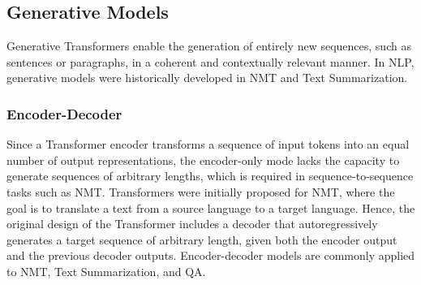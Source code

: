 

\subsection{Generative Models} 

Generative Transformers enable the generation of entirely new sequences, such as sentences or paragraphs, in a coherent and contextually relevant manner. In \ac{NLP}, generative models were historically developed in \ac{NMT} and Text Summarization. 




\subsubsection{Encoder-Decoder}


Since a Transformer encoder transforms a sequence of input tokens into an equal number of output representations, the encoder-only mode lacks the capacity to generate sequences of arbitrary lengths, which is required in sequence-to-sequence tasks such as \ac{NMT}. Transformers were initially proposed for \ac{NMT}, where the goal is to translate a text from a source language to a target language. Hence, the original design of the Transformer includes a decoder that autoregressively generates a target sequence of arbitrary length, given both the encoder output and the previous decoder outputs. Encoder-decoder models are commonly applied to \ac{NMT}, Text Summarization, and \ac{QA}.

